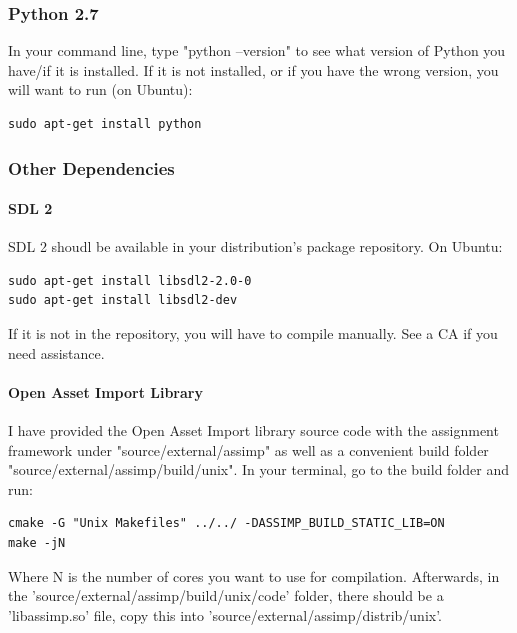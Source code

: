 \documentclass{article}
\begin{document}
\subsubsection*{Python 2.7}

In your command line, type "python --version" to see what version of Python you have/if it is installed. If it is not installed, or if you have the wrong version, you will want to run (on Ubuntu): 

\begin{lstlisting}
sudo apt-get install python
\end{lstlisting}

\subsubsection*{Other Dependencies}

\paragraph{\textbf{SDL 2}}

SDL 2 shoudl be available in your distribution's package repository. On Ubuntu:

\begin{lstlisting}
sudo apt-get install libsdl2-2.0-0
sudo apt-get install libsdl2-dev
\end{lstlisting}

If it is not in the repository, you will have to compile manually. See a CA if you need assistance.

\paragraph{\textbf{Open Asset Import Library}}

I have provided the Open Asset Import library source code with the assignment framework under "source/external/assimp" as well as a convenient build folder "source/external/assimp/build/unix". In your terminal, go to the build folder and run:

\begin{lstlisting}
cmake -G "Unix Makefiles" ../../ -DASSIMP_BUILD_STATIC_LIB=ON
make -jN
\end{lstlisting}

Where N is the number of cores you want to use for compilation. Afterwards, in the 'source/external/assimp/build/unix/code' folder, there should be a 'libassimp.so' file, copy this into 'source/external/assimp/distrib/unix'.
\end{document}
